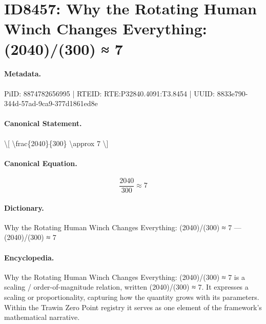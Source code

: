 \section*{ID8457: Why the Rotating Human Winch Changes Everything: (2040)/(300) ≈ 7}
\paragraph{Metadata.}
PiID: 8874782656995 | RTEID: RTE:P32840.4091:T3.8454 | UUID: 8833e790-344d-57ad-9ca9-377d1861ed8e

\paragraph{Canonical Statement.}
\textbackslash{}[ \textbackslash{}frac\{2040\}\{300\} \textbackslash{}approx 7 \textbackslash{}]

\paragraph{Canonical Equation.}
\[
\frac{2040}{300} \approx 7
\]

\paragraph{Dictionary.}
Why the Rotating Human Winch Changes Everything: (2040)/(300) ≈ 7 — (2040)/(300) ≈ 7

\paragraph{Encyclopedia.}
Why the Rotating Human Winch Changes Everything: (2040)/(300) ≈ 7 is a scaling / order-of-magnitude relation, written (2040)/(300) ≈ 7. It expresses a scaling or proportionality, capturing how the quantity grows with its parameters. Within the Trawin Zero Point registry it serves as one element of the framework's mathematical narrative.
